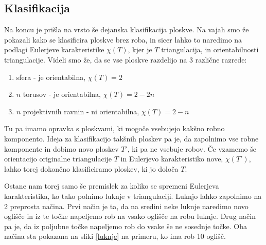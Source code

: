 \documentclass{article}
\begin{document}
\subsection{Klasifikacija}
Na koncu je prišla na vrsto še dejanska klasifikacija ploskve. Na vajah smo že pokazali kako se klasificira ploskve brez roba, in sicer lahko to naredimo na podlagi Eulerjeve karakteristike $\chi(T)$, kjer je $T$ triangulacija, in orientabilnosti triangulacije. Videli smo že, da se vse ploskve razdelijo na 3 različne razrede:
\begin{enumerate}
\item sfera - je orientabilna, $\chi(T)=2$ 
\item $n$ torusov - je orientabilna, $\chi(T)=2-2n$
\item $n$ projektivnih ravnin - ni orientabilna, $\chi(T)=2-n$
\end{enumerate}
Tu pa imamo opravka s ploskvami, ki mogoče vsebujejo kakšno robno komponento. Ideja za klasifikacijo takšnih ploskev pa je, da zapolnimo vse robne komponente in dobimo novo ploskev $T'$, ki pa ne vsebuje robov. Če vzamemo še orientacijo originalne triangulacije $T$ in Eulerjevo karakteristiko nove, $\chi(T')$, lahko torej dokončno klasificiramo ploskev, ki jo določa $T$.

Ostane nam torej samo še premislek za koliko se spremeni Eulerjeva karakteristika, ko tako polnimo luknje v triangulaciji. Luknjo lahko zapolnimo na 2 preprosta načina. Prvi način je ta, da na sredini neke luknje naredimo novo oglišče in iz te točke napeljemo rob na vsako oglišče na robu luknje. Drug način pa je, da iz poljubne točke napeljemo rob do vsake še ne sosednje točke. Oba načina sta pokazana na sliki \ref{luknje} na primeru, ko ima rob 10 oglišč.
\end{document}
